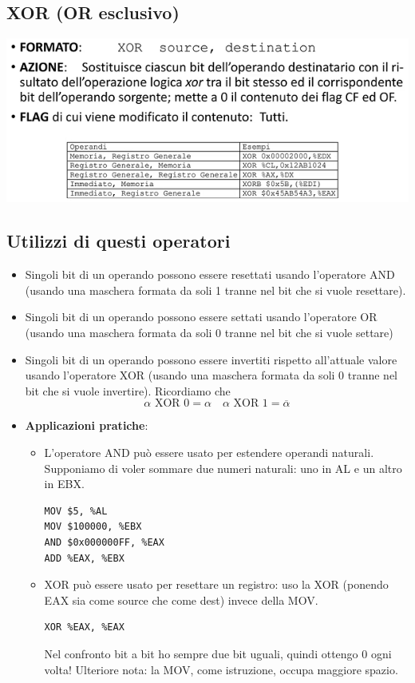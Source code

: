 \documentclass[11pt]{report}
\begin{document}
\subsection{XOR (OR esclusivo)}
\begin{center}
\includegraphics{img/35.PNG}
\end{center}
\subsection{Utilizzi di questi operatori}
\begin{itemize}
\item Singoli bit di un operando possono essere resettati usando l'operatore AND\\(usando una maschera formata da soli 1 tranne nel bit che si vuole resettare).
\item Singoli bit di un operando possono essere settati usando l'operatore OR\\(usando una maschera formata da soli 0 tranne nel bit che si vuole settare)
\item Singoli bit di un operando possono essere invertiti rispetto all'attuale valore usando l'operatore XOR (usando una maschera formata da soli 0 tranne nel bit che si vuole invertire). Ricordiamo che \[\alpha \text{ XOR } 0 = \alpha\,\,\,\,\,\,\alpha \text{ XOR } 1 = \overline{\alpha}\]
\item \textbf{Applicazioni pratiche}:
\begin{itemize}
\item L'operatore AND può essere usato per estendere operandi naturali. Supponiamo di voler sommare due numeri naturali: uno in AL e un altro in EBX. \begin{verbatim}
MOV $5, %AL
MOV $100000, %EBX
AND $0x000000FF, %EAX
ADD %EAX, %EBX
\end{verbatim}
\item XOR può essere usato per resettare un registro: uso la XOR (ponendo EAX sia come source che come dest) invece della MOV. 
\begin{verbatim}
XOR %EAX, %EAX
\end{verbatim}
Nel confronto bit a bit ho sempre due bit uguali, quindi ottengo 0 ogni volta! Ulteriore nota: la MOV, come istruzione, occupa maggiore spazio.
\end{itemize}
\end{itemize}
\clearpage
\end{document}
